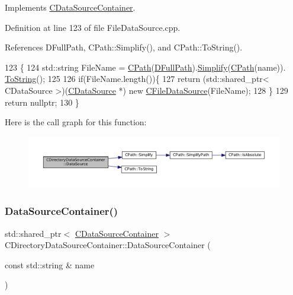 Implements \hyperlink{classCDataSourceContainer_aea214236c4ed2aef231072b909982f7d}{C\+Data\+Source\+Container}.



Definition at line 123 of file File\+Data\+Source.\+cpp.



References D\+Full\+Path, C\+Path\+::\+Simplify(), and C\+Path\+::\+To\+String().


\begin{DoxyCode}
123                                                                                            \{
124     std::string FileName = \hyperlink{classCPath}{CPath}(\hyperlink{classCDirectoryDataSourceContainer_ac3d3c7e7d7bc9f68ba8a8747a3dee8b5}{DFullPath}).\hyperlink{classCPath_aa52dcb50c943a8abc8883db5ec43a45e}{Simplify}(\hyperlink{classCPath}{CPath}(name)).
      \hyperlink{classCPath_abbafaf377a7e38e0151bd9567d526951}{ToString}();
125     
126     \textcolor{keywordflow}{if}(FileName.length())\{
127         \textcolor{keywordflow}{return} (std::shared\_ptr< CDataSource >)(\hyperlink{classCDataSource}{CDataSource} *) \textcolor{keyword}{new} 
      \hyperlink{classCFileDataSource}{CFileDataSource}(FileName);
128     \}
129     \textcolor{keywordflow}{return} \textcolor{keyword}{nullptr};
130 \}
\end{DoxyCode}
Here is the call graph for this function\+:\nopagebreak
\begin{figure}[H]
\begin{center}
\leavevmode
\includegraphics[width=350pt]{classCDirectoryDataSourceContainer_ac925eec9c2c71654d0012bff92a462d4_cgraph}
\end{center}
\end{figure}
\hypertarget{classCDirectoryDataSourceContainer_a71291ab0a549056fc784f0c553a8dc39}{}\label{classCDirectoryDataSourceContainer_a71291ab0a549056fc784f0c553a8dc39} 
\subsubsection{\texorpdfstring{Data\+Source\+Container()}{DataSourceContainer()}}
{\footnotesize\ttfamily std\+::shared\+\_\+ptr$<$ \hyperlink{classCDataSourceContainer}{C\+Data\+Source\+Container} $>$ C\+Directory\+Data\+Source\+Container\+::\+Data\+Source\+Container (\begin{DoxyParamCaption}\item[{const std\+::string \&}]{name }\end{DoxyParamCaption})\hspace{0.3cm}{\ttfamily [virtual]}}



